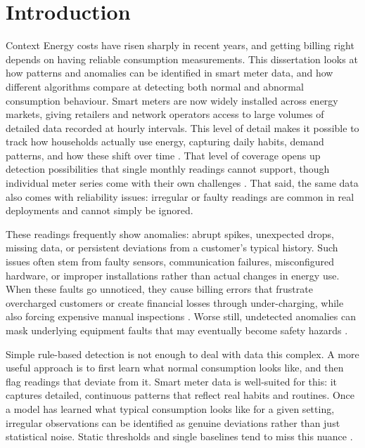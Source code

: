 ﻿\documentclass[12pt,reqno, twoside]{amsbook}
\makeatletter
\numberwithin{figure}{chapter}
\numberwithin{table}{chapter}
\numberwithin{equation}{chapter}
\def\section{\@startsection{section}{1}%
      \z@{.5\linespacing\@plus.7\linespacing}{.25\linespacing}%
      {\normalfont\bfseries\flushleft}}
\theoremstyle{plain}
\numberwithin{equation}{chapter}
\numberwithin{section}{chapter}
\makeatother
\begin{document}
\chapter{Introduction}
\label{chapter:intro}

\section{Context}
\label{section:context}
\noindent Energy costs have risen sharply in recent years, and getting billing right depends on having reliable consumption measurements. This dissertation looks at how patterns and anomalies can be identified in smart meter data, and how different algorithms compare at detecting both normal and abnormal consumption behaviour. Smart meters are now widely installed across energy markets, giving retailers and network operators access to large volumes of detailed data recorded at hourly intervals. This level of detail makes it possible to track how households actually use energy, capturing daily habits, demand patterns, and how these shift over time \cite{hernandez_detection_2024}. That level of coverage opens up detection possibilities that single monthly readings cannot support, though individual meter series come with their own challenges \cite{himeur_artificial_2021}. That said, the same data also comes with reliability issues: irregular or faulty readings are common in real deployments and cannot simply be ignored.

These readings frequently show anomalies: abrupt spikes, unexpected drops, missing data, or persistent deviations from a customer's typical history. Such issues often stem from faulty sensors, communication failures, misconfigured hardware, or improper installations rather than actual changes in energy use. When these faults go unnoticed, they cause billing errors that frustrate overcharged customers or create financial losses through under-charging, while also forcing expensive manual inspections \cite{gaur_performance_2019}. Worse still, undetected anomalies can mask underlying equipment faults that may eventually become safety hazards \cite{himeur_artificial_2021}.

Simple rule-based detection is not enough to deal with data this complex. A more useful approach is to first learn what normal consumption looks like, and then flag readings that deviate from it. Smart meter data is well-suited for this: it captures detailed, continuous patterns that reflect real habits and routines. Once a model has learned what typical consumption looks like for a given setting, irregular observations can be identified as genuine deviations rather than just statistical noise. Static thresholds and single baselines tend to miss this nuance \cite{gaur_performance_2019}.
\end{document}
